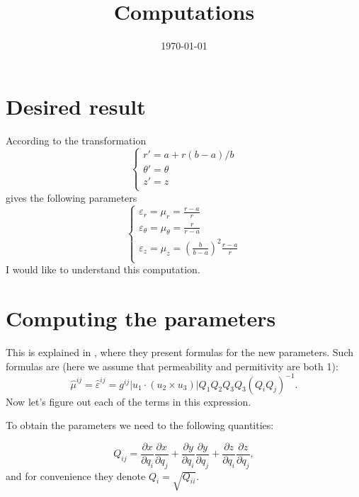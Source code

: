 \documentclass{amsart}
\begin{document}
\newcommand{\R}{\mathbb{R}}
\newcommand\tbf[1]{\textbf{#1}}
\newcommand\myworries[1]{\textcolor{red}{\tbf{#1}}}

\title{Computations}
\date{\today}
\maketitle

\section{Desired result}

According to \cite{smith06} the transformation
\[\begin{cases}
  r'=a+r(b-a)/b\\
  \theta'=\theta\\
  z'=z\\
\end{cases}\]
gives the following parameters
\[\begin{cases}
  \varepsilon_r=\mu_r=\frac{r-a}{r}\\
  \varepsilon_\theta=\mu_\theta=\frac{r}{r-a}\\
  \varepsilon_z=\mu_z=\left(\frac{b}{b-a}\right)^2\frac{r-a}{r}\\
\end{cases}\]
I would like to understand this computation.

\section{Computing the parameters}
This is explained in \cite{ward96}, where they present formulas for the new parameters.
Such formulas are (here we assume that permeability and permitivity are both 1):
\begin{equation}
  \hat{\mu}^{ij}=\hat{\varepsilon}^{ij}=g^{ij}|u_1\cdot(u_2\times u_3)|Q_1Q_2Q_3Q_3(Q_iQ_j)^{-1}.
\end{equation}
Now let's figure out each of the terms in this expression.

To obtain the parameters we need to the following quantities:

\begin{equation}\label{matrixQ}
  Q_{ij}=\frac{\partial x}{\partial q_i}\frac{\partial x}{\partial q_j}+\frac{\partial y}{\partial q_i}\frac{\partial y}{\partial q_j}+\frac{\partial z}{\partial q_i}\frac{\partial z}{\partial q_j},
\end{equation}
and for convenience they denote $Q_i=\sqrt{Q_{ii}}$.
\end{document}
